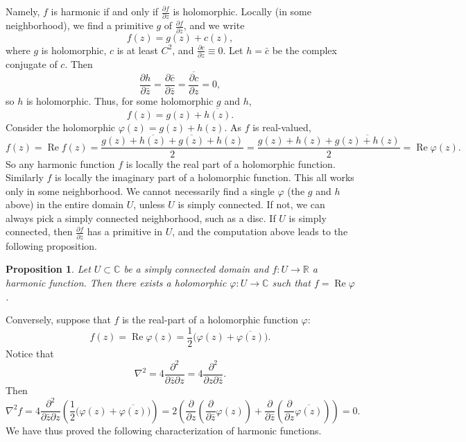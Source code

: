 \documentclass[12pt,openany]{book}
\renewcommand{\Re}{\operatorname{Re}}
\newcommand{\C}{{\mathbb{C}}}
\newcommand{\R}{{\mathbb{R}}}
\theoremstyle{plain}
\newtheorem{prop}[thm]{Proposition}
\theoremstyle{remark}
\theoremstyle{definition}
\theoremstyle{exercise}
\theoremstyle{example}
\begin{document}
Namely, $f$ is harmonic if and only if
$\frac{\partial f}{\partial z}$ is holomorphic.
Locally (in some neighborhood), we find a
primitive $g$ of $\frac{\partial f}{\partial z}$, and we write
\begin{equation*}
f(z) = g(z) + c(z) ,
\end{equation*}
where $g$ is holomorphic, $c$ is at least $C^2$, and $\frac{\partial c}{\partial z} \equiv 0$.
Let $h = \bar{c}$ be the complex conjugate of $c$.  Then 
\begin{equation*}
\frac{\partial h}{\partial \bar{z}}
=
\frac{\partial \bar{c}}{\partial \bar{z}}
=
\overline{
\frac{\partial c}{\partial z}
}
=
0 ,
\end{equation*}
so $h$ is holomorphic.  Thus, for some holomorphic $g$ and $h$,
\begin{equation*}
f(z) = g(z) + \overline{h(z)} .
\end{equation*}
Consider the holomorphic $\varphi(z) = g(z) + h(z)$.
As $f$ is real-valued,
\begin{equation*}
f(z) = \Re f(z) =
\frac{g(z) + \overline{h(z)} + \overline{g(z)}+h(z)}{2}
=
\frac{g(z) + h(z) + \overline{g(z)+h(z)}}{2}
=
\Re \varphi(z) .
\end{equation*}
So any harmonic function $f$ is locally the real part of a holomorphic
function.  Similarly $f$ is locally the imaginary part of a holomorphic
function.
This all works only in some neighborhood.  We cannot necessarily find a single
$\varphi$ (the $g$ and $h$ above) in the entire
domain $U$, unless $U$ is simply connected.  If not, we can always
pick a simply connected neighborhood, such as a disc.
If $U$ is simply connected, then
$\frac{\partial f}{\partial z}$ has a primitive in $U$,
and the computation above leads to
the following proposition.

\begin{prop} \label{prop:harmconj}
Let $U \subset \C$ be a simply connected domain and $f \colon U \to \R$ a
harmonic function.  Then there exists a holomorphic $\varphi \colon
U \to \C$ such that $f = \Re \varphi$.
\end{prop}

Conversely,
suppose that $f$ is the real-part of a holomorphic function $\varphi$:
\begin{equation*}
f(z) = \Re \varphi(z) =
\frac{1}{2}\bigl( \varphi(z) + \overline{\varphi(z)} \bigr) .
\end{equation*}
Notice that
\begin{equation*}
\nabla^2 =
4 \frac{\partial^2}{\partial \bar{z} \partial z}
=
4 \frac{\partial^2}{\partial z \partial \bar{z}} .
\end{equation*}
Then
\begin{equation*}
\nabla^2 f =
4 \frac{\partial^2}{\partial \bar{z} \partial z}
\left(
\frac{1}{2}\bigl( \varphi(z) + \overline{\varphi(z)} \bigr)
\right)
=
2
\left(
\frac{\partial}{\partial z}
\left(
\frac{\partial}{\partial \bar{z}}
\varphi(z)
\right)+
\frac{\partial}{\partial \bar{z}}
\left(
\frac{\partial}{\partial z}
\overline{\varphi(z)}
\right)
\right)
=
0 .
\end{equation*}
We have thus proved the following characterization of harmonic
functions.
\end{document}
